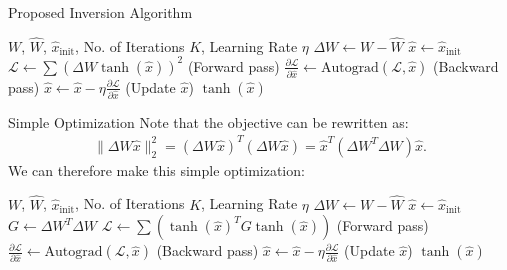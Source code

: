 \documentclass{beamer}
\begin{document}
\begin{frame}{Proposed Inversion Algorithm}

\begin{algorithm}[H]
\caption{AdaRound Inversion Algorithm}\label{alg:inversion}
\begin{algorithmic}[1]
\Require $W$, $\hat{W}$, $\hat{x}_{\text{init}}$, No. of Iterations $K$, Learning Rate $\eta$
\State $\Delta W \gets W - \hat{W}$
\State $\hat{x} \gets \hat{x}_\text{init}$
    \State $\mathcal{L}  \gets \sum \left( \Delta W  \tanh(\hat{x}) \right)^2$ (Forward pass)
    \State $\frac{\partial \mathcal{L}}{\partial \hat{x}} \gets \text{Autograd}(\mathcal{L}, \hat{x})$ (Backward pass)
    \State $\hat{x} \gets \hat{x} - \eta \frac{\partial\mathcal{L}}{\partial{\hat{x}}}$ (Update $\hat{x}$)
\EndFor
\State \Return $\tanh(\hat{x})$
\end{algorithmic}
\end{algorithm}
\end{frame}
\begin{frame}{Simple Optimization}
Note that the objective can be rewritten as:
\begin{align}
\|\Delta W \hat{x}\|_2^2 = (\Delta W \hat{x})^T(\Delta W \hat{x}) = \hat{x}^T (\Delta W^T \Delta W) \hat{x}.
\end{align}We can therefore make this simple optimization:

\begin{algorithm}[H]
\caption{Optimized AdaRound Inversion Algorithm}\label{alg:inversion_optimized}
\begin{algorithmic}[1]
\Require $W$, $\hat{W}$, $\hat{x}_{\text{init}}$, No. of Iterations $K$, Learning Rate $\eta$
\State $\Delta W \gets W - \hat{W}$
\State $\hat{x} \gets \hat{x}_\text{init}$
\State $G \gets \Delta W^T \Delta W$
    \State $\mathcal{L}  \gets \sum \left( \tanh(\hat{x})^TG  \tanh(\hat{x}) \right)$ (Forward pass)
    \State $\frac{\partial \mathcal{L}}{\partial \hat{x}} \gets \text{Autograd}(\mathcal{L}, \hat{x})$ (Backward pass)
    \State $\hat{x} \gets \hat{x} - \eta \frac{\partial\mathcal{L}}{\partial{\hat{x}}}$ (Update $\hat{x}$)
\EndFor
\State \Return $\tanh(\hat{x})$
\end{algorithmic}
\end{algorithm}
\end{frame}
\end{document}
